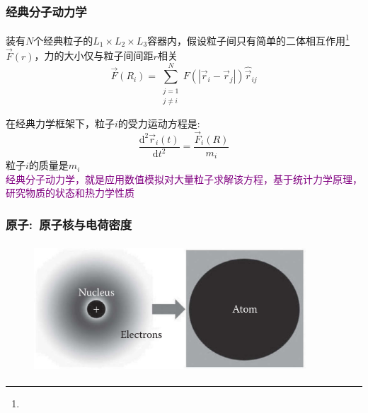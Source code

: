 \frame
{
	\frametitle{经典分子动力学}
	装有$N$个经典粒子的$L_1\times L_2\times L_3$容器内，假设粒子间只有简单的二体相互作用\footnote{\fontsize{7.2pt}{6.2pt}\selectfont{二体作用是粒子间多体相互作用的简化，只考虑粒子两两间彼此相互作用。}}$\vec F(r)$，力的大小仅与粒子间间距$r$相关
	\begin{displaymath}
		\vec F(R_i)=\sum_{\substack{j=1\\j\neq i}}^N F(|\vec r_i-\vec r_j|)\hat{\vec r}_{ij}
	\end{displaymath}
	{\fontsize{7.2pt}{6.2pt}}

	在经典力学框架下，粒子$i$的受力运动方程是:~
	\begin{displaymath}
		\dfrac{\mathrm{d}^2\vec r_i(t)}{\mathrm{d}t^2}=\dfrac{\vec F_i(R)}{m_i}
	\end{displaymath}
	粒子$i$的质量是$m_i$\\
	\textcolor{purple}{经典分子动力学，就是应用数值模拟对大量粒子求解该方程，基于统计力学原理，研究物质的状态和热力学性质}
}

\frame
{
	\frametitle{原子:~原子核与电荷密度}
\begin{figure}[h!]
\centering
\vspace{3.5pt}
\includegraphics[height=1.90in,width=4.00in,viewport=0 0 1096 487,clip]{Figures/MD_atom_electron-nucleus.png}
\label{MO-Atom-Nuclear-electron}
\end{figure}
}

